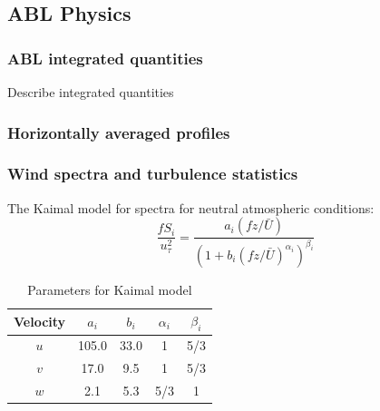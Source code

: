 \subsection{ABL Physics}

\subsubsection{ABL integrated quantities}
Describe integrated quantities

\subsubsection{Horizontally averaged profiles}

\subsubsection{Wind spectra and turbulence statistics}

The Kaimal model for spectra \cite{kaimal1973turbulence,
  cheynet2017spectral} for neutral atmospheric conditions:
\begin{equation}
  \label{eq:kaimal}
  \frac{fS_i}{u_\tau^2} = \frac{a_i(fz/\bar{U})}{\left(1+b_i(fz/\bar{U})^{\alpha_i}\right)^{\beta_i}}
\end{equation}

\begin{table}
\caption{\label{tab:KaimalParameters} Parameters for Kaimal model}
\centering
\begin{tabular}{ccccc}
  \hline
  Velocity & $a_i$ & $b_i$ & $\alpha_i$  & $\beta_i$ \\
  \hline
  $u$      & 105.0 & 33.0  & 1           & 5/3  \\
  $v$      &  17.0 &  9.5  & 1           & 5/3  \\
  $w$      &   2.1 &  5.3  & 5/3         &   1  \\
\hline
\end{tabular}
\end{table}


